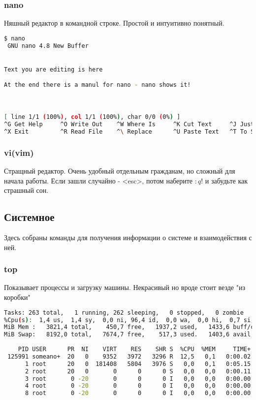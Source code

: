 \documentclass[11pt]{article}
\begin{document}
\subsubsection*{nano}
Няшный редактор в командной строке. Простой и интуитивно понятный.
 \begin{lstlisting}[language=bash]
 $ nano
 GNU nano 4.8 New Buffer


Text you are editing is here

At the end there is a manul for nano - nano shows it!



[ line 1/1 (100%), col 1/1 (100%), char 0/0 (0%) ]
^G Get Help     ^O Write Out    ^W Where Is     ^K Cut Text     ^J Justify      ^C Cur Pos      M-U Undo       
^X Exit         ^R Read File    ^\ Replace      ^U Paste Text   ^T To Spell     ^_ Go To Line   M-E Redo       
\end{lstlisting}

\subsubsection*{vi(vim)}
Стращный редактор. Очень удобный отдельным гражданам, но сложный для начала работы. Если зашли случайно - <esc>, потом наберите $:q!$ и забудьте как страшный сон.

\subsection*{Системное}
Здесь собраны команды для получения информации о системе и взаимодействия с ней.

\subsubsection*{top}
Показывает процессы и загрузку машины. Некрасивый но вроде стоит везде "из коробки"
\begin{lstlisting}[language=bash]
Tasks: 263 total,   1 running, 262 sleeping,   0 stopped,   0 zombie        
%Cpu(s):  1,4 us,  1,4 sy,  0,0 ni, 96,4 id,  0,0 wa,  0,0 hi,  0,7 si,  0  
MiB Mem :   3821,4 total,    450,7 free,   1937,2 used,   1433,6 buff/cach  
MiB Swap:   8192,0 total,   7674,7 free,    517,3 used.   1403,6 avail Mem  
                                                                            
    PID USER      PR  NI    VIRT    RES    SHR S  %CPU  %MEM     TIME+      
 125991 someano+  20   0    9352   3972   3296 R  12,5   0,1   0:00.02      
      1 root      20   0  181408   5804   3976 S   0,0   0,1   0:05.15      
      2 root      20   0       0      0      0 S   0,0   0,0   0:00.11      
      3 root       0 -20       0      0      0 I   0,0   0,0   0:00.00      
      4 root       0 -20       0      0      0 I   0,0   0,0   0:00.00      
      8 root       0 -20       0      0      0 I   0,0   0,0   0:00.00    
\end{lstlisting}
\end{document}
